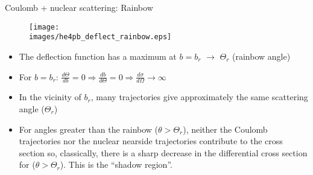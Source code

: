 \documentclass[english,10pt]{beamer}
\newcommand{\images}{images}
\begin{document}
\begin{frame}{Coulomb + nuclear scattering: Rainbow}


\begin{figure}{\par \resizebox*{0.5\textwidth}{!}
{\texttt{[image: \\images/he4pb\_deflect\_rainbow.eps]}} \par}
\end{figure}

\begin{itemize}
\item[\ding{43}] The deflection function has a maximum at $b=b_r$  $\rightarrow$  $\Theta_r$ ({\verde rainbow angle})
\item[\ding{43}] For $b=b_r$:
 $ \frac{d\Theta}{db} =0  \Rightarrow \frac{db}{d\Theta} =0 \Rightarrow  \frac{d\sigma}{d\Omega} \to \infty $
\item[\ding{43}] In the vicinity of $b_r$, many trajectories give approximately the same scattering angle ($\Theta_r$)
\item[\ding{43}] For angles greater than the rainbow ($\theta > \Theta_r$), neither the Coulomb trajectories nor the nuclear nearside trajectories  contribute to the cross section so, classically, there is a sharp decrease in the differential cross section for ($\theta > \Theta_r$). This is the ``{\verde shadow region}''.
\end{itemize}

\end{frame}
\end{document}
